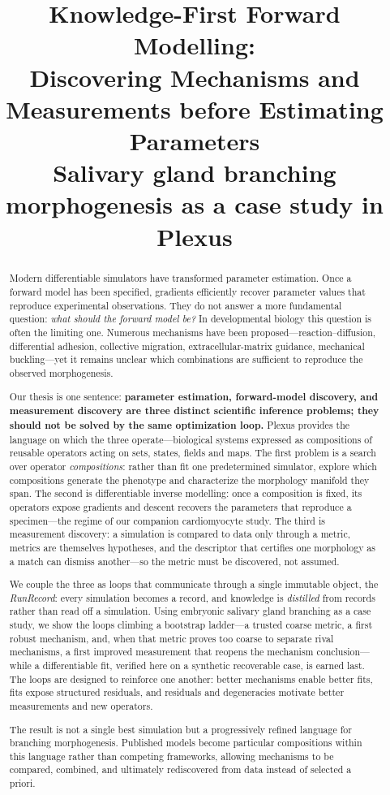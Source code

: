 \documentclass[11pt]{article}
\title{
Knowledge-First Forward Modelling:\\
Discovering Mechanisms and Measurements before Estimating Parameters\\[4pt]
\large Salivary gland branching morphogenesis as a case study in Plexus
}
\author{}
\date{}
\begin{document}
\maketitle

\begin{abstract}
Modern differentiable simulators have transformed parameter estimation. Once a forward model has been specified, gradients efficiently recover parameter values that reproduce experimental observations. They do not answer a more fundamental question: \emph{what should the forward model be?} In developmental biology this question is often the limiting one. Numerous mechanisms have been proposed---reaction--diffusion, differential adhesion, collective migration, extracellular-matrix guidance, mechanical buckling---yet it remains unclear which combinations are sufficient to reproduce the observed morphogenesis.

Our thesis is one sentence: \textbf{parameter estimation, forward-model discovery, and measurement discovery are three distinct scientific inference problems; they should not be solved by the same optimization loop.} Plexus provides the language on which the three operate---biological systems expressed as compositions of reusable operators acting on sets, states, fields and maps. The first problem is a search over operator \emph{compositions}: rather than fit one predetermined simulator, explore which compositions generate the phenotype and characterize the morphology manifold they span. The second is differentiable inverse modelling: once a composition is fixed, its operators expose gradients and descent recovers the parameters that reproduce a specimen---the regime of our companion cardiomyocyte study. The third is measurement discovery: a simulation is compared to data only through a metric, metrics are themselves hypotheses, and the descriptor that certifies one morphology as a match can dismiss another---so the metric must be discovered, not assumed.

We couple the three as loops that communicate through a single immutable object, the \emph{RunRecord}: every simulation becomes a record, and knowledge is \emph{distilled} from records rather than read off a simulation. Using embryonic salivary gland branching as a case study, we show the loops climbing a bootstrap ladder---a trusted coarse metric, a first robust mechanism, and, when that metric proves too coarse to separate rival mechanisms, a first improved measurement that reopens the mechanism conclusion---while a differentiable fit, verified here on a synthetic recoverable case, is earned last. The loops are designed to reinforce one another: better mechanisms enable better fits, fits expose structured residuals, and residuals and degeneracies motivate better measurements and new operators.

The result is not a single best simulation but a progressively refined language for branching morphogenesis. Published models become particular compositions within this language rather than competing frameworks, allowing mechanisms to be compared, combined, and ultimately rediscovered from data instead of selected a priori.
\end{abstract}
\end{document}

